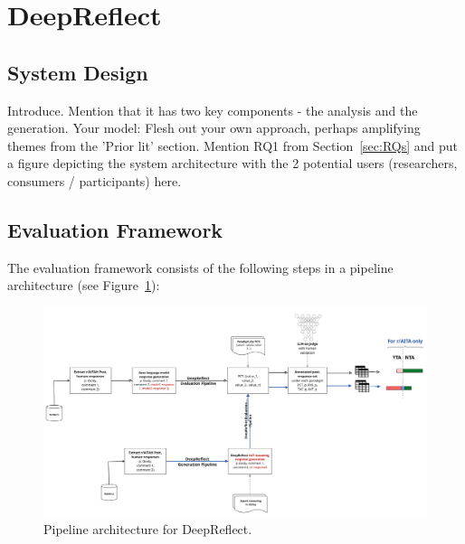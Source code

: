 

\section{DeepReflect}\label{sec:deepreflect}

\subsection{System Design}


\textcolor{black!40}{Introduce. Mention that it has two key components - the analysis and the generation. Your model: Flesh out your own approach, perhaps amplifying themes from the 'Prior lit' section. Mention RQ1 from Section~\ref{sec:RQs} and put a figure depicting the system architecture with the 2 potential users (researchers, consumers / participants) here.}


\subsection{Evaluation Framework}

The evaluation framework consists of the following steps in a pipeline architecture (see Figure~\ref{fig:pipeline}):

\begin{figure}[h!]
    \centering
    \includegraphics[width=0.98\columnwidth]{Diagrams/pipeline.jpg}
    \caption{Pipeline architecture for DeepReflect.}
    \label{fig:pipeline}
\end{figure}

